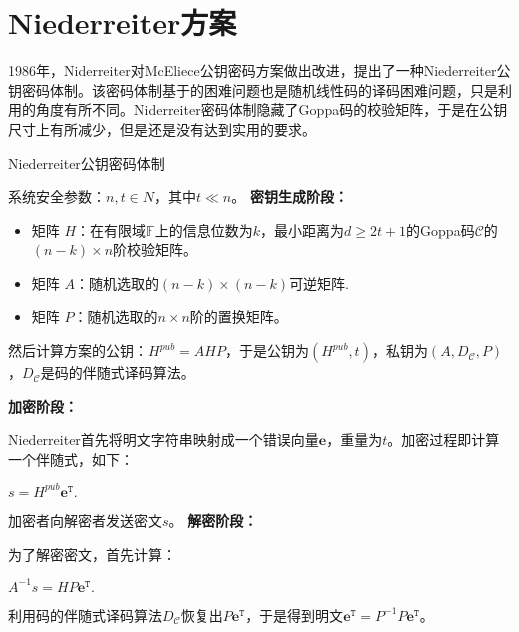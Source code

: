 \section{Niederreiter方案}
1986年，Niderreiter对McEliece公钥密码方案做出改进，提出了一种Niederreiter公钥密码体制。该密码体制基于的困难问题也是随机线性码的译码困难问题，只是利用的角度有所不同。Niderreiter密码体制隐藏了Goppa码的校验矩阵，于是在公钥尺寸上有所减少，但是还是没有达到实用的要求。

\begin{breakablealgorithm}
	\small
	\renewcommand{\algorithmicrequire}{\textbf{Input:}}
	\renewcommand{\algorithmicensure}{\textbf{Output:}}
	\caption{Niederreiter公钥密码体制}
	\label{alg:Niederreiter}
	\begin{algorithmic}	
		\State
		系统安全参数：$n,t \in N$，其中$t \ll n$。
		\State
		\textbf{密钥生成阶段：}
		
		\begin{itemize}
			\item 矩阵 $H$：在有限域$\mathbb{F}$上的信息位数为$k$，最小距离为$d \geq 2t + 1$的Goppa码$\mathcal{C}$的$(n-k) \times n$阶校验矩阵。
			\item 矩阵 $A$：随机选取的$(n-k) \times (n-k)$可逆矩阵.
			\item 矩阵 $P$：随机选取的$n \times n$阶的置换矩阵。			
		\end{itemize}
	
		然后计算方案的公钥：$H^{pub} = AHP$，于是公钥为$(H^{pub}, t)$，私钥为$(A,D_\mathcal{C},P)$，$D_\mathcal{C}$是码的伴随式译码算法。
		
		\State
		\textbf{加密阶段：}
		
		Niederreiter首先将明文字符串映射成一个错误向量$\mathbf{e}$，重量为$t$。加密过程即计算一个伴随式，如下：
		
		\begin{center}
			$s = H^{pub}\mathbf{e}^\mathtt{T}.$
		\end{center}
		
		加密者向解密者发送密文$s$。
		\State
		\textbf{解密阶段：}
		
		为了解密密文，首先计算：
		\begin{center}
			$A^{-1}s = HP\mathbf{e}^\mathtt{T}.$
		\end{center}
	    利用码的伴随式译码算法$D_\mathcal{C}$恢复出$P\mathbf{e}^\mathtt{T}$，于是得到明文$\mathbf{e}^\mathtt{T} = P^{-1}P\mathbf{e}^\mathtt{T}$。		
	\end{algorithmic}
\end{breakablealgorithm}

